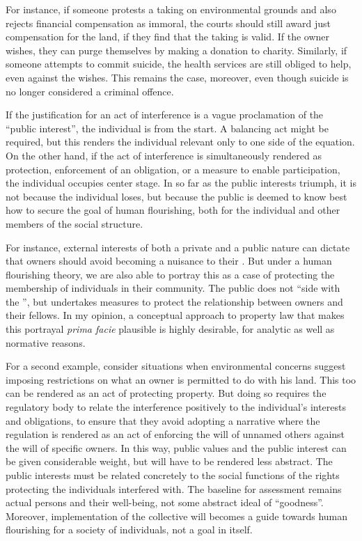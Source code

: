 For instance, if someone protests a taking on environmental grounds and also rejects financial compensation as immoral, the courts should still award just compensation for the land, if they find that the taking is valid. If the owner wishes, they can purge themselves by making a donation to charity. Similarly, if someone attempts to commit suicide, the health services are still obliged to help, even against the  wishes. This remains the case, moreover, even though suicide is no longer considered a criminal offence.

 If the justification for an act of interference is a vague proclamation of the ``public interest'', the individual is  from the start. A balancing act might be required, but this renders the individual relevant only to one side of the equation. On the other hand, if the act of interference is simultaneously rendered as protection, enforcement of an obligation, or a measure to enable participation, the individual occupies center stage. In so far as the public interests triumph, it is not because the individual loses, but because the public is deemed to know best how to secure the goal of human flourishing, both for the individual and other members of the social structure.

For instance, external interests of both a private and a public nature can dictate that owners should avoid becoming a nuisance to their . But under a human flourishing theory, we are also able to portray this as a case of protecting the membership of individuals in their community. The public does not ``side with the '', but undertakes measures to protect the relationship between owners and their fellows. In my opinion, a conceptual approach to property law that makes this portrayal {\it prima facie} plausible is highly desirable, for analytic as well as normative reasons.

For a second example, consider situations when environmental concerns suggest imposing restrictions on what an owner is permitted to do with his land. This too can be rendered as an act of protecting property. But doing so requires the regulatory body to relate the interference positively to the individual's interests and obligations, to ensure that they avoid adopting a narrative where the regulation is rendered as an act of enforcing the will of unnamed others against the will of specific owners. In this way, public values and the public interest can be given considerable weight, but will have to be rendered less abstract. The public interests must be related concretely to the social functions of the rights protecting the individuals interfered with. The baseline for assessment remains actual persons and their well-being, not some abstract ideal of ``goodness''. Moreover, implementation of the collective will becomes a guide towards human flourishing for a society of individuals, not a goal in itself.

